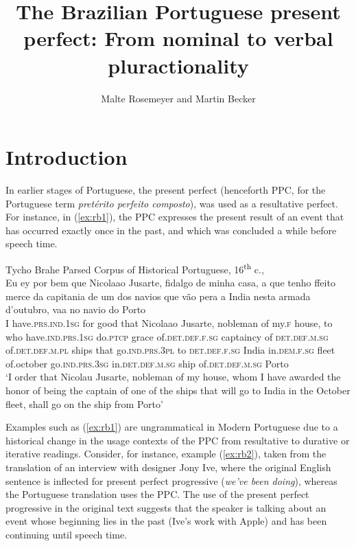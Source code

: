 \documentclass[output=paper,colorlinks,citecolor=brown]{langscibook}
\title[The Brazilian Portuguese present perfect]{The Brazilian Portuguese present perfect: From nominal to verbal pluractionality}
\author{Malte Rosemeyer\orcid{}\affiliation{Freie Universität Berlin} and Martin Becker\orcid{}\affiliation{University of Cologne}}
\begin{document}
\maketitle

\section{Introduction} \label{sec:rb1}
In earlier stages of Portuguese, the present perfect (henceforth PPC, for the Portuguese term \textit{pretérito perfeito composto}), was used as a resultative perfect. For instance, in (\ref{ex:rb1}), the PPC expresses the present result of an event that has occurred exactly once in the past, and which was concluded a while before speech time.

\ea\label{ex:rb1}
Tycho Brahe Parsed Corpus of Historical Portuguese, 16\textsuperscript{th} c., \citet[28]{AmaralHowe2012}\\
\gll Eu ey por bem que Nicolaao Jusarte, fidalgo de minha casa, a que tenho ffeito merce da capitania de um dos navios que vão pera a India nesta armada d'outubro, vaa no navio do Porto \\
I have.\textsc{prs.ind.1sg} for good that Nicolaao Jusarte, nobleman of my.\textsc{f} house, to who have.\textsc{ind.prs.1sg} do.\textsc{ptcp} grace of.\textsc{det.def.f.sg} captaincy of \textsc{det.def.m.sg} of.\textsc{det.def.m.pl} ships that go.\textsc{ind.prs.3pl} to \textsc{det.def.f.sg} India in.\textsc{dem.f.sg} fleet of.october go.\textsc{ind.prs.3sg} in.\textsc{det.def.m.sg} ship of.\textsc{det.def.m.sg} Porto\\
\glt ‘I order that Nicolau Jusarte, nobleman of my house, whom I have awarded the honor of being the captain of one of the ships that will go to India in the October fleet, shall go on the ship from Porto’
\z
 
Examples such as (\ref{ex:rb1}) are ungrammatical in Modern Portuguese due to a historical change in the usage contexts of the PPC from resultative to durative or iterative readings. Consider, for instance, example (\ref{ex:rb2}), taken from the translation of an interview with designer Jony Ive, where the original English sentence is inflected for present perfect progressive (\textit{we’ve been doing}), whereas the Portuguese translation uses the PPC. The use of the present perfect progressive in the original text suggests that the speaker is talking about an event whose beginning lies in the past (Ive’s work with Apple) and has been continuing until speech time.
\end{document}
